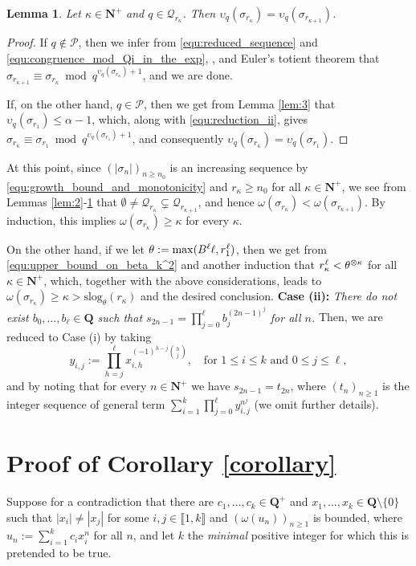 \documentclass[reqno]{amsart}
\newtheorem{lemma}{Lemma}
\theoremstyle{remark}
\providecommand{\NNb}{\mathbf{N}}
\providecommand{\PPc}{\mathcal{P}}
\providecommand{\QQb}{\mathbf{Q}}
\providecommand{\QQc}{\mathcal{Q}}
\providecommand\llb{\llbracket}
\providecommand\rrb{\rrbracket}
\newcommand{\slog}{\mathrm{slog}}
\newcommand{\fixed}[2][1]{%
  \begingroup
  \spaceskip=#1\fontdimen2\font minus \fontdimen4\font
  \xspaceskip=0pt\relax
  #2%
  \endgroup
}
\begin{document}
%
\begin{lemma}
\label{lem:4}
Let $\kappa \in \NNb^+$ and $q \in \QQc_{r_\kappa}$. Then $\upsilon_q(\sigma_{r_\kappa}) = \upsilon_q(\sigma_{r_{\kappa+1}})$.
\end{lemma}
%
\begin{proof}%
If $q \notin \PPc$, then we infer from \eqref{equ:reduced_sequence} and \eqref{equ:congruence_mod_Qi_in_the_exp}, \cite[Theorem 2.5(a)]{Apo}, and Euler's totient theorem that
$\sigma_{r_{\kappa+1}} \equiv \sigma_{r_\kappa} \bmod q^{\upsilon_q(\sigma_{r_\kappa}) + 1}$, and we are done.

If, on the other hand, $q \in \PPc$, then we get from Lemma \ref{lem:3} that $\upsilon_q(\sigma_{r_1}) \le \alpha-1$, which, along with \eqref{equ:reduction_ii}, gives $
\sigma_{r_\kappa} \equiv \sigma_{r_1} \bmod q^{\upsilon_q(\sigma_{r_1})+1}$, and consequently $\upsilon_q(\sigma_{r_\kappa}) = \upsilon_q(\sigma_{r_1})$.
\end{proof}
%
At this point, since $(|\sigma_n|)_{n \ge n_0}$ is an increasing sequence by \eqref{equ:growth_bound_and_monotonicity} and $r_\kappa \ge n_0$ for all $\kappa \in \mathbf N^+$, we see from Lemmas \ref{lem:2}-\ref{lem:4} that $\emptyset \ne \QQc_{r_\kappa} \subsetneq \QQc_{r_{\kappa+1}}$, and hence $\omega(\sigma_{r_\kappa}) < \omega(\sigma_{r_{\kappa+1}})$. By induction, this implies $\omega(\sigma_{r_\kappa}) \ge \kappa$ for every $\kappa$.

On the other hand, if we let $\theta := \max(B^\ell \ell, r_1^{\fixed[0.1]{\text{ }}\ell})$, then we get from \eqref{equ:upper_bound_on_beta_k^2} and another induction that $r_\kappa^{\fixed[0.1]{\text{ }}\ell} < \theta^{\otimes\kappa}$ for all $\kappa \in \NNb^+$, which, together with the above considerations, leads to $\omega(\sigma_{r_\kappa}) \ge \kappa > \slog_\theta(r_\kappa)$ and the desired conclusion.
%
\vskip 0.3cm
%
\noindent{}\textbf{Case (ii):} \textit{There do not exist $b_0, \ldots, b_\ell \in \QQb$ such that $s_{2n-1} = \prod_{j=0}^\ell b_j^{(2n-1)^j}$ for all $n$.} Then, we are reduced to Case (i) by taking
$$
y_{i,j} := \prod_{h=j}^\ell x_{i,h}^{(-1)^{h-j} \binom{h}{j}}, \quad \text{for }1 \le i \le k \text{ and }0 \le j \le \ell,
$$
and by noting that for every $n \in \NNb^+$ we have $s_{2n-1} = t_{2n}$, where $(t_n)_{n \ge 1}$ is the integer sequence of general term $\sum_{i=1}^k \prod_{j=0}^\ell y_{i,j}^{n^j}$
(we omit further details).
%
\section{Proof of Corollary \texorpdfstring{\ref{corollary}}{3}}
\label{sec:proof:cor(3)}
%
Suppose for a contradiction that there are $c_1, \ldots, c_k \in \QQb^+$ and $x_1, \ldots, x_k \in \mathbf Q \setminus \{0\}$ such that $|x_i| \ne |x_j|$ for some $i, j \in \llb 1, k \rrb$ and $(\omega(u_n))_{n \ge 1}$ is bounded, where $u_n := \sum_{i=1}^k c_i x_i^n$ for all $n$, and let $k$ the \textit{minimal} positive integer for which this is pretended to be true.
\end{document}
